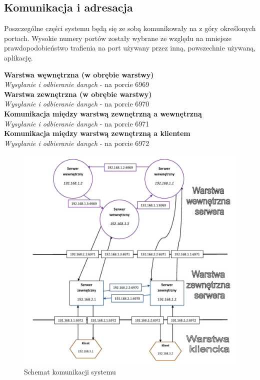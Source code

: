 \subsection[Komunikacja i adresacja]{Komunikacja i adresacja}

\par{Poszczególne części systemu będą się ze sobą komunikowały na z góry określonych portach. Wysokie numery portów zostały wybrane ze względu na mniejsze prawdopodobieństwo trafienia na port używany przez inną, powszechnie używaną, aplikację.}


\textbf{Warstwa węwnętrzna (w obrębie warstwy)} \\
\textit{Wysyłanie i odbieranie danych} - na porcie 6969 \\

\textbf{Warstwa zewnętrzna (w obrębie warstwy)} \\
\textit{Wysyłanie i odbieranie danych} - na porcie 6970 \\


\textbf{Komunikacja między warstwą zewnętrzną a wewnętrzną} \\
\textit{Wysyłanie i odbieranie danych} - na porcie 6971 \\


\textbf{Komunikacja między warstwą zewnętrzną a klientem} \\
\textit{Wysyłanie i odbieranie danych} - na porcie 6972 \\

\begin{figure}[h]
\begin{center}
\includegraphics[width=0.9\linewidth]{img/komunikacja_schemat.jpg} 
\caption{Schemat komunikacji systemu}
\label{img:dane_net}
\end{center}
\end{figure}


